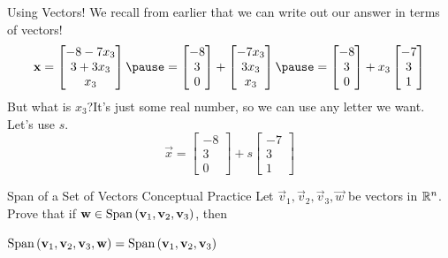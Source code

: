 \documentclass[xcoler=dvipsnames, aspectratio=169]{beamer}
\begin{document}
    \begin{frame}{Using Vectors!}
        We recall from earlier that we can write out our answer in terms of vectors!
        \[
            \vec{x} = \begin{bmatrix}
                -8-7x_3\\
                3+3x_3\\
                x_3
            \end{bmatrix}\pause = \begin{bmatrix}
                -8\\
                3 \\
                0
            \end{bmatrix} + \begin{bmatrix}
                -7x_3\\
                3x_3\\
                x_3
            \end{bmatrix}\pause = \begin{bmatrix}
                -8\\
                3 \\
                0
            \end{bmatrix} + x_3\begin{bmatrix}
                -7\\
                3\\
                1
            \end{bmatrix}
        \]
        \pause
        But what is $x_3$?\pause It's just some real number, so we can use any letter we want. Let's use $s$.
        \pause
        \[
            \vec{x} = \begin{bmatrix}
                -8\\3\\0
            \end{bmatrix} + s\begin{bmatrix}
                -7\\3\\1
            \end{bmatrix}
        \]
    \end{frame}
    \begin{frame}{Span of a Set of Vectors Conceptual Practice}
        Let $\vec{v}_1,\vec{v}_2,\vec{v}_3,\vec{w}$ be vectors in $\mathbb{R}^n$. 
        Prove that if $\mathbf{w}\in\text{Span}\left(\mathbf{v}_1,\mathbf{v}_2,\mathbf{v}_3\right)$, then

        $\text{Span}\left(\mathbf{v}_1,\mathbf{v}_2,\mathbf{v}_3,\mathbf{w}\right) = \text{Span}\left(\mathbf{v}_1,\mathbf{v}_2,\mathbf{v}_3\right)$
        \vspace{150pt}
    \end{frame}
\end{document}
